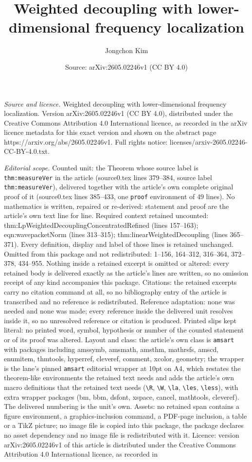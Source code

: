 \documentclass[10pt,a4paper]{amsart}
\title[Weighted decoupling with lower-dimensional frequency localiz]{Weighted decoupling with lower-dimensional frequency localization}
\author{Jongchon Kim}
\date{Source: arXiv:2605.02246v1 (CC BY 4.0)}
\begin{document}
\maketitle

\noindent\emph{Source and licence.} Weighted decoupling with lower-dimensional frequency localization. Version arXiv:2605.02246v1 (CC BY 4.0), distributed under the Creative Commons Attribution 4.0 International licence, as recorded in the arXiv licence metadata for this exact version and shown on the abstract page https://arxiv.org/abs/2605.02246v1. Full rights notice: licenses/arxiv-2605.02246-CC-BY-4.0.txt.\par\smallskip

\noindent\textit{Editorial scope.} Counted unit: the Theorem whose source label is \texttt{thm:measureVer} in the article (source0.tex lines 379--384, source label \texttt{thm:measureVer}), delivered together with the article's own complete original proof of it (source0.tex lines 385--433, one \texttt{proof} environment of 49 lines). No mathematics is written, repaired or re-derived: statement and proof are the article's own text line for line. Required context retained uncounted: thm:LpWeightedDecouplingConcentratedRefined (lines 157--163); eqn:wavepacketNorm (lines 313--315); thm:linearWeightedDecoupling (lines 365--371). Every definition, display and label of those lines is retained unchanged. Omitted from this package and not redistributed: 1--156, 164--312, 316--364, 372--378, 434--955. Nothing inside a retained excerpt is omitted or altered: every retained body is delivered exactly as the article's lines are written, so no omission receipt of any kind accompanies this package. Citations: the retained excerpts carry no citation command at all, so no bibliography entry of the article is transcribed and no reference is redistributed. Reference adaptation: none was needed and none was made; every reference inside the delivered unit resolves inside it, so no unresolved reference or citation is produced. Printed slips kept literal: no printed word, symbol, hypothesis or number of the counted statement or of its proof was altered. Layout and class: the article's own class is \texttt{amsart} with packages including amssymb, amsmath, amsthm, mathrsfs, amscd, enumitem, thmtools, hyperref, cleveref, comment, xcolor, geometry; the wrapper is the lane's pinned \texttt{amsart} editorial wrapper at 10pt on A4, which restates the theorem-like environments the retained text needs and adds the article's own macro definitions that the retained text needs (\texttt{\textbackslash R}, \texttt{\textbackslash W}, \texttt{\textbackslash la}, \texttt{\textbackslash les}, \texttt{\textbackslash less}), with extra wrapper packages (bm, bbm, dsfont, xspace, cancel, mathtools, cleveref). The delivered numbering is the unit's own. Assets: no retained span contains a figure environment, a graphics-inclusion command, a PDF-page inclusion, a table or a TikZ picture; no image file is copied into this package, the package declares no asset dependency and no image file is redistributed with it. Licence: version arXiv:2605.02246v1 of this article is distributed under the Creative Commons Attribution 4.0 International licence, as recorded in 
\end{document}
